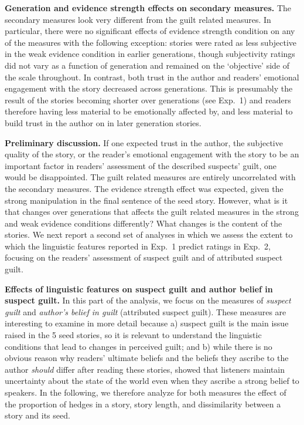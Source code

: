 \documentclass[10pt,letterpaper]{article}
\begin{document}
\textbf{Generation and evidence strength effects on secondary measures.} The secondary measures look very different from the guilt related measures. In particular, there were no significant effects of evidence strength condition on any of the measures with the following exception: stories were rated as less subjective in the weak evidence condition in earlier generations, though subjectivity ratings did not vary as a function of generation and remained on the `objective' side of the scale throughout. In contrast, both trust in the author and readers' emotional engagement with the story decreased across generations. This is presumably the result of the stories becoming shorter over generations (see Exp.~1) and readers therefore having less material to be emotionally affected by, and less material to build trust in the author on in later generation stories.

\textbf{Preliminary discussion.} If one expected trust in the author, the subjective quality of the story, or the reader's emotional engagement with the story to be an important factor in readers' assessment of the described suspects' guilt, one would be disappointed. The guilt related measures are entirely uncorrelated with the secondary measures. The evidence strength effect was expected, given the strong manipulation in the final sentence of the seed story. However, what is it that changes over generations that affects the guilt related measures in the strong and weak evidence conditions differently? What changes is the content of the stories. We next report a second set of analyses  in which we assess the extent to which the linguistic features reported in Exp.~1 predict ratings in Exp.~2, focusing on the readers' assessment of suspect guilt and of attributed suspect guilt.

\textbf{Effects of linguistic features on suspect guilt and author belief in suspect guilt.} 
 In this part of the analysis, we focus on the measures of \textit{suspect guilt} and \textit{author's belief in guilt} (attributed suspect guilt). These measures are interesting to examine in more detail because a) suspect guilt is the main issue raised in the 5 seed stories, so it is relevant to understand the linguistic conditions that lead to changes in perceived guilt; and b) while there is no obvious reason why readers' ultimate beliefs and the beliefs they ascribe to the author \emph{should} differ after reading these stories,  showed that listeners maintain uncertainty about the state of the world even when they ascribe a strong belief to speakers. In the following, we therefore analyze for both measures the effect of the proportion of hedges in a story, story length, and dissimilarity between a story and its seed.
\end{document}
